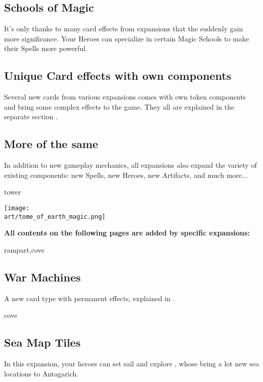 \begin{multicols*}{2}
\subsection*{Schools of Magic}
It's only thanks to many card effects from expansions that the  suddenly gain more significance. Your Heroes can specialize in certain Magic Schools to make their Spells more powerful.

\subsection*{Unique Card effects with own components}
Several new cards from various expansions comes with own token components and bring some complex effects to the game. They all are explained in the separate section  .

\subsection*{More of the same}
In addition to new gameplay mechanics, all expansions also expand the variety of existing components: new Spells, new Heroes, new Artifacts, and much more...

\begin{expansion}{tower}
\end{expansion}

\begin{center}
\texttt{[image: \\art/tome\_of\_earth\_magic.png]}
\end{center}
\pagebreak

\textbf{All contents on the following pages are added by specific expansions:}

\begin{expansion}{rampart,cove}
\subsection*{War Machines}
  A new card type with permanent effects, explained in .
\end{expansion}

\vspace*{1em}
\begin{expansion}{cove}
	\subsection*{Sea Map Tiles}
	In this expansion, your heroes can set sail and explore , whose bring a lot new sea locations to Antagarich.
\end{expansion}


\end{multicols*}
